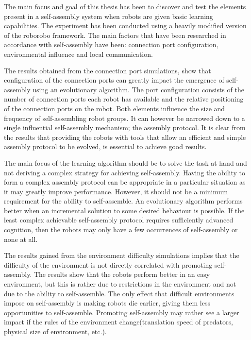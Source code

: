 The main focus and goal of this thesis has been to discover and test the elements present in a self-assembly system when robots are given basic learning capabilities.
The experiment has been conducted using a heavily modified version of the roborobo framework.
The main factors that have been researched in accordance with self-assembly have been: connection port configuration, environmental influence and local communication.

The results obtained from the connection port simulations, show that configuration of the connection ports can greatly impact the emergence of self-assembly using an evolutionary algorithm.
The port configuration consists of the number of connection ports each robot has available and the relative positioning of the connection ports on the robot.
Both elements influence the size and frequency of self-assembling robot groups.
It can however be narrowed down to a single influential self-assembly mechanism; the assembly protocol.
It is clear from the results that providing the robots with tools that allow an efficient and simple assembly protocol to be evolved, is essential to achieve good results.

The main focus of the learning algorithm should be to solve the task at hand and not deriving a complex strategy for achieving self-assembly.
Having the ability to form a complex assembly protocol can be appropriate in a particular situation as it may greatly improve performance.
However, it should not be a minimum requirement for the ability to self-assemble.
An evolutionary algorithm performs better when an incremental solution to some desired behaviour is possible.
If the least complex achievable self-assembly protocol requires sufficiently advanced cognition, then the robots may only have a few occurrences of self-assembly or none at all.

The results gained from the environment difficulty simulations implies that the difficulty of the environment is not directly correlated with promoting self-assembly.
The results show that the robots perform better in an easy environment, but this is rather due to restrictions in the environment and not due to the ability to self-assemble.
The only effect that difficult environments impose on self-assembly is making robots die earlier, giving them less opportunities to self-assemble.
Promoting self-assembly may rather see a larger impact if the rules of the environment change(translation speed of predators, physical size of environment, etc.).

